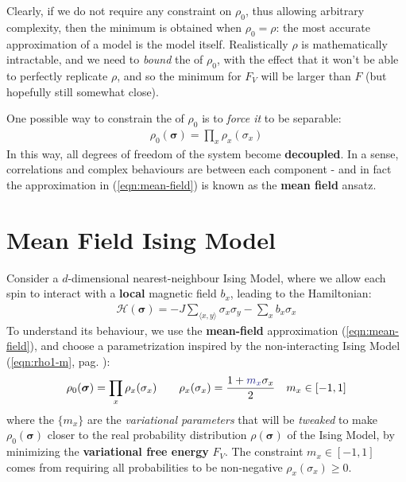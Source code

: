 \documentclass[../../main.tex]{subfiles}
\begin{document}
\medskip

Clearly, if we do not require any constraint on $\rho_0$, thus allowing arbitrary complexity, then the minimum is obtained when $\rho_0 = \rho$: the most accurate approximation of a model is the model itself. Realistically $\rho$ is mathematically intractable, and we need to \textit{bound} the  of $\rho_0$, with the effect that it won't be able to perfectly replicate $\rho$, and so the minimum for $F_V$ will be larger than $F$ (but hopefully still somewhat close).

\medskip

One possible way to constrain the  of $\rho_0$ is to \textit{force it} to be separable: 
\begin{align}\label{eqn:mean-field}
    \rho_0(\bm{\sigma}) = \prod_x \rho_x (\sigma_x)
\end{align} 
In this way, all degrees of freedom of the system become \textbf{decoupled}. In a sense, correlations and complex behaviours are  between each component - and in fact the approximation in (\ref{eqn:mean-field}) is known as the \textbf{mean field} ansatz. 

\section{Mean Field Ising Model}
Consider a $d$-dimensional nearest-neighbour Ising Model, where we allow each spin to interact with a \textbf{local} magnetic field $b_x$, leading to the Hamiltonian:
\begin{align*}
    \mathcal{H}(\bm{\sigma}) = -J \sum_{\langle x,y \rangle} \sigma_x \sigma_y - \sum_x b_x \sigma_x
\end{align*}
To understand its behaviour, we use the \textbf{mean-field} approximation (\ref{eqn:mean-field}), and choose a parametrization inspired by the non-interacting Ising Model (\ref{eqn:rho1-m}, pag. \pageref{eqn:rho1-m}):
\begin{align} \label{eqn:mfi}
    \rho_0(\bm{\sigma}) = \prod_x \rho_x(\sigma_x) \qquad \rho_x(\sigma_x) = \frac{1+\textcolor{Blue}{m_x} \sigma_x}{2} \quad m_x \in [-1,1]
\end{align}
where the $\{m_x\}$ are the \textit{variational parameters} that will be \textit{tweaked} to make $\rho_0(\bm{\sigma})$ closer to the real probability distribution $\rho(\bm{\sigma})$ of the Ising Model, by minimizing the \textbf{variational free energy} $F_V$. The constraint $m_x \in [-1,1]$ comes from requiring all probabilities to be non-negative $\rho_x(\sigma_x) \geq 0$.
\end{document}
